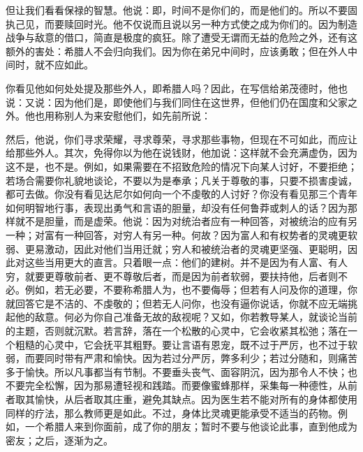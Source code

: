 但让我们看看保禄的智慧。他说：即，时间不是你们的，而是他们的。所以不要固执己见，而要赎回时光。他不仅说而且说以另一种方式使之成为你们的。因为制造战争与敌意的借口，简直是极度的疯狂。除了遭受无谓而无益的危险之外，还有这额外的害处：希腊人不会归向我们。因为你在弟兄中间时，应该勇敢；但在外人中间时，就不应如此。\par

你看见他如何处处提及那些外人，即希腊人吗？因此，在写信给弟茂德时，他也说：又说：因为他们是，即使他们与我们同住在这世界，但他们仍在国度和父家之外。他也用称别人为来安慰他们，如先前所说：\par

然后，他说，你们寻求荣耀，寻求尊荣，寻求那些事物，但现在不可如此，而应让给那些外人。其次，免得你以为他在说钱财，他加说：这样就不会充满虚伪，因为这不是，也不是。例如，如果需要在不招致危险的情况下向某人讨好，不要拒绝；若场合需要你礼貌地谈论，不要以为是奉承；凡关于尊敬的事，只要不损害虔诚，都可去做。你没有看见达尼尔如何向一个不虔敬的人讨好？你没有看见那三个青年如何明智地行事，表现出勇气和言语的胆量，却没有任何鲁莽或刺人的话？因为那样就不是胆量，而是虚荣。他说：因为对统治者应有一种回答，对被统治的应有另一种；对富有一种回答，对穷人有另一种。何故？因为富人和有权势者的灵魂更软弱、更易激动，因此对他们当用迁就；穷人和被统治者的灵魂更坚强、更聪明，因此对这些当用更大的直言。只着眼一点：他们的建树。并不是因为有人富、有人穷，就要更尊敬前者、更不尊敬后者，而是因为前者软弱，要扶持他，后者则不必。例如，若无必要，不要称希腊人为，也不要侮辱；但若有人问及你的道理，你就回答它是不洁的、不虔敬的；但若无人问你，也没有逼你说话，你就不应无端挑起他的敌意。何必为你自己准备无故的敌视呢？又如，你若教导某人，就谈论当前的主题，否则就沉默。若言辞，落在一个松散的心灵中，它会收紧其松弛；落在一个粗糙的心灵中，它会抚平其粗野。要让言语有恩宠，既不过于严厉，也不过于软弱，而要同时带有严肃和愉快。因为若过分严厉，弊多利少；若过分随和，则痛苦多于愉快。所以凡事都当有节制。不要垂头丧气、面容阴沉，因为那令人不快；也不要完全松懈，因为那易遭轻视和践踏。而要像蜜蜂那样，采集每一种德性，从前者取其愉快，从后者取其庄重，避免其缺点。因为医生若不能对所有的身体都使用同样的疗法，那么教师更是如此。不过，身体比灵魂更能承受不适当的药物。例如，一个希腊人来到你面前，成了你的朋友；暂时不要与他谈论此事，直到他成为密友；之后，逐渐为之。\par

